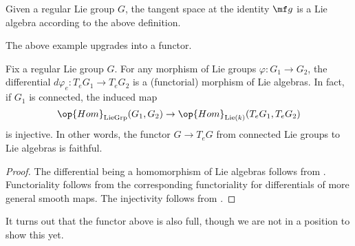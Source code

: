 \documentclass[../notes.tex]{subfiles}
\begin{document}
\begin{example}
	Given a regular Lie group $G$, the tangent space at the identity $\mf g$ is a Lie algebra according to the above definition.
\end{example}
The above example upgrades into a functor.
\begin{proposition} \label{prop:lie-group-to-lie-algebra}
	Fix a regular Lie group $G$. For any morphism of Lie groups $\varphi\colon G_1\to G_2$, the differential $d\varphi_e\colon T_eG_1\to T_eG_2$ is a (functorial) morphism of Lie algebras. In fact, if $G_1$ is connected, the induced map
	\[\op{Hom}_{\mathrm{LieGrp}}(G_1,G_2)\to\op{Hom}_{\mathrm{Lie}(k)}(T_eG_1,T_eG_2)\]
	is injective. In other words, the functor $G\to T_eG$ from connected Lie groups to Lie algebras is faithful.
\end{proposition}
\begin{proof}
	The differential being a homomorphism of Lie algebras follows from . Functoriality follows from the corresponding functoriality for differentials of more general smooth maps. The injectivity follows from .
\end{proof}
\begin{remark}
	It turns out that the functor above is also full, though we are not in a position to show this yet.
\end{remark}
\end{document}
